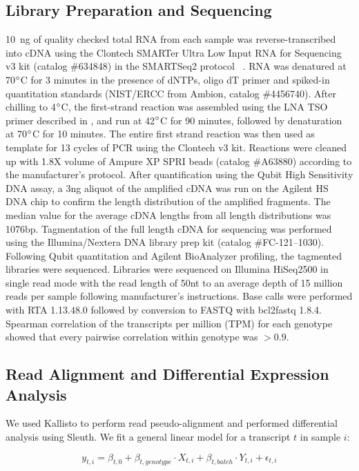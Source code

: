 \documentclass[10pt, onecolumn]{article}
\begin{document}
\subsection*{Library Preparation and Sequencing}
10~ng of quality checked total RNA from each sample was
reverse-transcribed into cDNA using the Clontech SMARTer Ultra Low Input RNA for
Sequencing v3 kit (catalog \#634848) in the SMARTSeq2 protocol
~\cite{Picelli2014}.  RNA was denatured at 70$\degree{}$C for 3 minutes
in the presence of dNTPs, oligo dT primer and spiked-in quantitation standards
(NIST/ERCC from Ambion, catalog \#4456740).  After chilling to 4$\degree{}$C, the
first-strand reaction was assembled using the LNA TSO primer described in \citep{Picelli2014},
and run at 42$\degree{}$C for 90 minutes, followed by denaturation at 70$\degree{}$C for 10
minutes.  The entire first strand reaction was then used as template for 13
cycles of PCR using the Clontech v3 kit. Reactions were cleaned up with 1.8X
volume of Ampure XP SPRI beads (catalog \#A63880) according to the manufacturer’s
protocol.  After quantification using the Qubit High Sensitivity DNA assay, a 3ng
aliquot of the amplified cDNA was run on the Agilent HS DNA chip to confirm the
length distribution of the amplified fragments.  The median value for the
average cDNA lengths from all length distributions was 1076bp.  Tagmentation of
the full length cDNA for sequencing was performed using the Illumina/Nextera DNA
library prep kit (catalog \#FC-121--1030).  Following Qubit quantitation and
Agilent BioAnalyzer profiling, the tagmented libraries were sequenced.
Libraries were sequenced on Illumina HiSeq2500 in single read mode with the read
length of 50nt to an average depth of 15 million reads per sample following
manufacturer's instructions. Base calls were performed with RTA 1.13.48.0
followed by conversion to FASTQ with bcl2fastq 1.8.4. Spearman correlation of
the transcripts per million (TPM) for each genotype showed that every pairwise
correlation within genotype was $>0.9$.

\subsection*{Read Alignment and Differential Expression Analysis}
We used Kallisto to perform read pseudo-alignment and performed differential
analysis using Sleuth. We fit a general linear model for a transcript $t$ in
sample $i$:

\begin{equation}
  y_{t,i} = \beta_{t, 0} + \beta_{t, genotype}\cdot{}X_{t, i} +
  \beta_{t, batch}\cdot{}Y_{t, i} + \epsilon_{t, i}
\end{equation}
\end{document}
